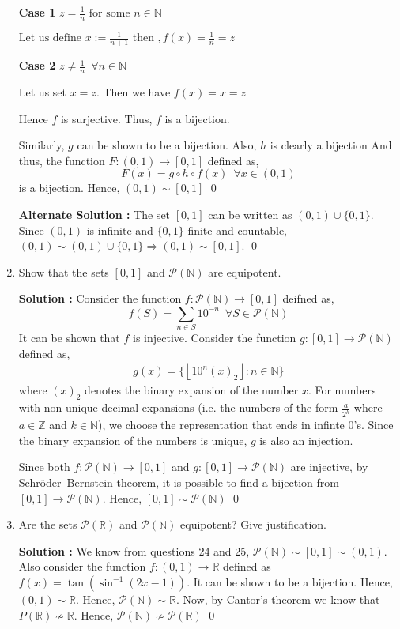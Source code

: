 \documentclass[10pt]{article}
\newcommand{\nn}{\mathbb{N}}
\newcommand{\rn}{\mathbb{R}}
\newcommand{\p}{\mathcal{P}}
\newcommand{\z}{\mathbb{Z}}
\begin{document}
\begin{enumerate}
    \textbf{Case 1} $z = \frac{1}{n} \text{ for some } n \in \nn$

        $\text{Let us define }x := \frac{1}{n + 1} \text{ then }, f(x) = \frac{1}{n} = z$

    \textbf{Case 2} $z \neq \frac{1}{n} \,\,\,\forall n \in \nn$

        Let us set $x = z$. Then we have $f(x) = x = z$

    Hence $f$ is surjective. Thus, $f$ is a bijection.
    
    Similarly, $g$ can be shown to be a bijection. Also, $h$ is clearly a bijection And thus, the function $F : (0, 1) \to [0, 1]$ defined as, $$F(x) = g\circ h\circ f(x) \, \, \, \forall x \in (0,1)$$ is a bijection. Hence, $(0,1) \sim [0, 1]$ \qed
    
    \textbf{Alternate Solution : }The set $[0, 1]$ can be written as $(0, 1) \cup \{0, 1 \}$. Since $(0, 1)$ is infinite and $\{0, 1\}$ finite and countable, $(0, 1) \sim (0, 1) \cup \{0, 1\}\Rightarrow (0, 1) \sim [0, 1]$. \qed
    \item Show that the sets $[0, 1]$ and $\p(\nn)$ are equipotent.

	    \textbf{Solution : }Consider the function $f : \p(\nn) \to [0,1]$ deifned as, 
	    $$f(S) = \sum_{n\in S} 10^{-n} \,\,\, \forall S \in \p(\nn)$$ It can be shown that $f$ is injective. 
	    Consider the function $g: [0, 1] \to \p(\nn)$ defined as, 
	    \begin{align*}
	    g(x) = \{\left \lfloor 10^n(x)_2 \right \rfloor : n \in \nn \} 
	    \end{align*}
	    where $(x)_2$ denotes the binary expansion of the number $x$. For numbers with non-unique decimal expansions (i.e. the numbers of the form
	    $\frac{a}{2^k}$ where $a \in \z$ and $k \in \nn$),
	    we choose the representation that ends in infinte 0's. 
	    Since the binary expansion of the numbers is unique, $g$ is also an injection. 

	    Since both $f: \p(\nn) \to [0,1]$ and $g: [0,1] \to \p(\nn)$ are injective, by Schröder–Bernstein theorem, it is possible to find
	    a bijection from $[0, 1] \to \p(\nn)$. Hence, $[0, 1] \sim \p(\nn)$ \qed
	    

    \item Are the sets $\p(\rn)$ and $\p(\nn)$ equipotent? Give justification. 

    \textbf{Solution : }We know from questions 24 and 25, $\p(\nn) \sim [0, 1] \sim (0, 1)$.
    Also consider the function $f : (0, 1) \to \rn$ defined as $f(x) = \tan(\sin^{-1}(2x - 1))$. It can be shown to be a bijection. Hence, $(0, 1) \sim \rn$. Hence, $\p(\nn) \sim \rn$. Now, by Cantor's theorem we know that $P(\rn) \not \sim \rn$. Hence, $\p(\nn) \not\sim \p(\rn)$ \qed
\end{enumerate}
\end{document}
